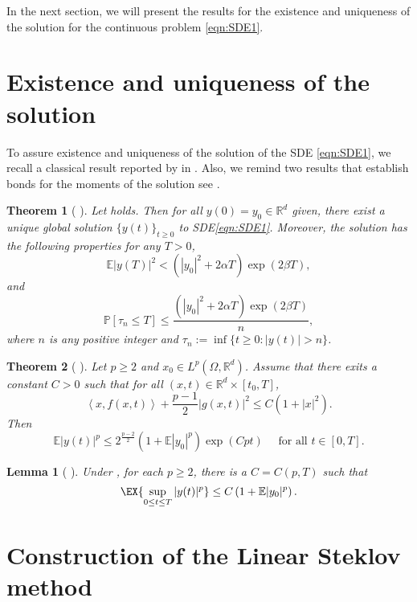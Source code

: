 \documentclass[3p]{elsarticle}
\theoremstyle{definition}
\theoremstyle{plain}%
\newtheorem{thm}{Theorem}[section]
\newtheorem{lem}{Lemma}[section]
\theoremstyle{remark}
\newcommand{\ms}[1]{\mathbb{E}\left|#1\right|^2}
\newcommand{\mep}[1]{\mathbb{E}|#1|^p}
\newcommand{\m}[1]{\mathbb{E}#1}
\newcommand{\Prob}[1]{\mathbb{P}\left[#1\right]}
\newcommand{\innerprod}[2]{\left\langle#1, #2\right\rangle}
\begin{document}
In the next section, we will present the results for the existence and uniqueness of
the solution for the continuous problem \eqref{eqn:SDE1}.

\section{Existence and uniqueness of the solution} 


	To assure existence and uniqueness of the solution of the SDE \eqref{eqn:SDE1}, we recall a 
classical result reported by \citeauthor*{Mao2013} in \cite{Mao2013}.  Also, we remind two results that establish bonds
for the moments of the solution see \cite{Higham2002b,Mao2007}.
\begin{thm}[{
	 \cite[Thm. 2.2]{Mao2013}}]
	Let  holds. Then for all $y(0)=y_0\in \mathbb{R}^d$ given, there exist a 
	unique global solution $\{y(t)\}_{t\geq 0}$ to SDE\eqref{eqn:SDE1}. Moreover, the solution has the 
	following properties for any $T>0$,
	\begin{equation*}
		\ms{y(T)}< 
		\left(
			|y_0|^2 +2\alpha T 
		\right)\exp(2\beta T),
	\end{equation*}
	and
	\begin{equation*}
	\Prob{\tau_n\leq T}
	\leq \frac{
		\left(
		|y_0|^2 +2\alpha T 
		\right)
		\exp(2\beta T)
	}{n},
	\end{equation*}
	where $n$ is any positive integer and 
	$\tau_n := \inf \{ t\geq 0 : |y(t)|>n\}$.
\end{thm}
%
\begin{thm}[
		{\cite[Thm. 2.4.1]{Mao2007}}
	]
	\label{thm:MaoCoercive}
	Let $p\geq 2$ and $x_0\in L^p(\Omega, \mathbb{R}^d)$. Assume that there exits a constant $C>0$
	such that for all $(x,t)\in \mathbb{R}^d\times [t_0,T]$,
	\begin{equation*}
	\innerprod{x}{f(x,t)}+\frac{p-1}{2}|g(x,t)|^2 \leq C(1+|x|^2).
	\end{equation*}
	Then
	\begin{equation*}
	\m|y(t)|^p
	\leq
	2^{\frac{p-2}{2}}
	\left(
	1 + \m|y_0|^p
	\right)\exp({Cpt}) \quad \text{ for all } t\in[0,T].
	\end{equation*}
\end{thm}
%
\begin{lem}[
	{
		\cite[Lem 3.2]{Higham2002b}}
	]
	\label{lem:MomentBound}
	Under , for each $p\geq 2$, there is a $C=C(p,T)$ such that
	\begin{equation*}
	\EX{\sup_{0\leq t \leq T}|y(t)|^p}\leq C \left(1+\mep{y_0}\right).
	\end{equation*}
\end{lem}\section{Construction of the Linear Steklov method} 
\end{document}
